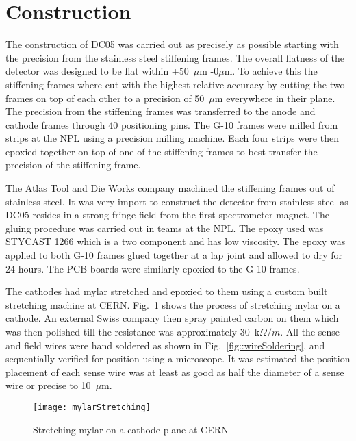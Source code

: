 \section{Construction}

The construction of DC05 was carried out as precisely as possible starting with
the precision from the stainless steel stiffening frames.  The overall flatness
of the detector was designed to be flat within +50~$\mu$m -0$\mu$m.  To achieve
this the stiffening frames where cut with the highest relative accuracy by
cutting the two frames on top of each other to a precision of 50~$\mu$m
everywhere in their plane.  The precision from the stiffening frames was
transferred to the anode and cathode frames through 40 positioning pins.  The
G-10 frames were milled from strips at the NPL using a precision milling
machine.  Each four strips were then epoxied together on top of one of the
stiffening frames to best transfer the precision of the stiffening frame.

The Atlas Tool and Die Works company machined the stiffening frames out of
stainless steel.  It was very import to construct the detector from stainless
steel as DC05 resides in a strong fringe field from the first spectrometer
magnet.  The gluing procedure was carried out in teams at the NPL.  The epoxy
used was STYCAST 1266 which is a two component and has low viscosity.  The epoxy
was applied to both G-10 frames glued together at a lap joint and allowed to dry
for 24 hours.  The PCB boards were similarly epoxied to the G-10 frames.

The cathodes had mylar stretched and epoxied to them using a custom built
stretching machine at CERN.  Fig.~\ref{fig::mylarStretching} shows the process
of stretching mylar on a cathode.  An external Swiss company then spray painted
carbon on them which was then polished till the resistance was approximately
30~k$\Omega /m$.  All the sense and field wires were hand soldered as shown in
Fig.~\ref{fig::wireSoldering}, and sequentially verified for position using a
microscope.  It was estimated the position placement of each sense wire was at
least as good as half the diameter of a sense wire or precise to 10~$\mu$m.

\begin{figure}[h!t]
  \centering \texttt{[image: mylarStretching]}
  \caption{Stretching mylar on a cathode plane at CERN}
  \label{fig::mylarStretching}
\end{figure}

